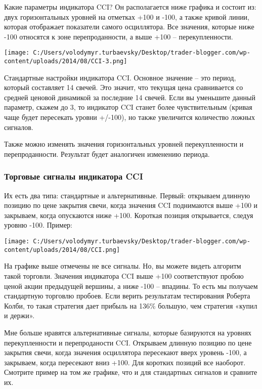 \documentclass[a5paper]{article}
\begin{document}
Какие параметры индикатора CCI? Он располагается ниже графика и состоит из: двух горизонтальных уровней на отметках +100 и -100, а также кривой линии, которая отображает  показатели самого осциллятора. Все значения, которые ниже -100 относятся к зоне перепроданности, а выше +100 – перекупленности.

\texttt{[image: C:/Users/volodymyr.turbaevsky/Desktop/trader-blogger.com/wp-content/uploads/2014/08/CCI-3.png]}

Стандартные настройки индикатора CCI. Основное значение – это период, который составляет 14 свечей. Это значит, что текущая цена сравнивается со средней ценовой динамикой за последние 14 свечей. Если вы уменьшите данный параметр, скажем до 3, то индикатор CCI станет более чувствительным (кривая чаще будет пересекать уровни +/-100), но также увеличится количество ложных сигналов.

Также можно изменять значения горизонтальных уровней перекупленности и
перепроданности. Результат будет аналогичен изменению периода.

\subsubsection{Торговые сигналы индикатора CCI}

Их есть два типа: стандартные и альтернативные. Первый: открываем длинную позицию по цене закрытия свечи, когда значения CCI поднимаются выше +100 и закрываем, когда опускаются ниже +100. Короткая позиция открывается, следуя уровню -100. Пример:

\texttt{[image: C:/Users/volodymyr.turbaevsky/Desktop/trader-blogger.com/wp-content/uploads/2014/08/CCI.png]}

На графике выше отмечены не все сигналы. Но, вы можете видеть алгоритм такой торговли. Значения индикатора CCI выше +100 соответствуют пробою ценой акции предыдущей вершины, а ниже -100 – впадины. То есть мы получаем стандартную торговлю пробоев. Если верить результатам тестирования Роберта Колби, то такая стратегия дает прибыль на 136\% большую, чем стратегия «купил и держи».

Мне больше нравятся альтернативные сигналы, которые базируются на уровнях перекупленности и перепроданости CCI. Открываем длинную позицию по цене закрытия свечи, когда значения осциллятора пересекают вверх уровень -100, а закрываем, когда пересекают вниз +100. Для коротких позиций все наоборот. Смотрите пример на том же графике, что и для стандартных сигналов и сравните их.
\end{document}
